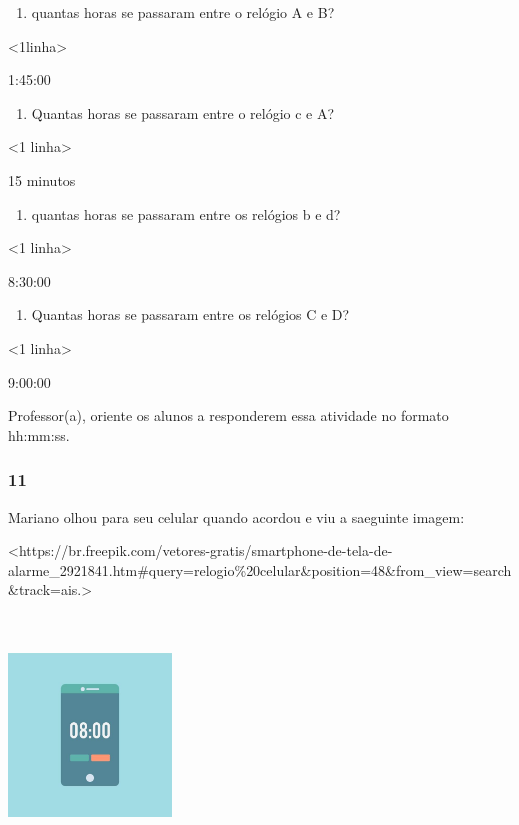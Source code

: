 \begin{enumerate}
\def\labelenumi{\Alph{enumi})}
\item
  quantas horas se passaram entre o relógio A e B?
\end{enumerate}

\textless{}1linha\textgreater{}

1:45:00

\begin{enumerate}
\def\labelenumi{\Alph{enumi})}
\item
  Quantas horas se passaram entre o relógio c e A?
\end{enumerate}

\textless{}1 linha\textgreater{}

15 minutos

\begin{enumerate}
\def\labelenumi{\Alph{enumi})}
\item
  quantas horas se passaram entre os relógios b e d?
\end{enumerate}

\textless{}1 linha\textgreater{}

8:30:00

\begin{enumerate}
\def\labelenumi{\Alph{enumi})}
\item
  Quantas horas se passaram entre os relógios C e D?
\end{enumerate}

\textless{}1 linha\textgreater{}

9:00:00

Professor(a), oriente os alunos a responderem essa atividade no formato
hh:mm:ss.

\subsubsection{11}\label{section-49}

Mariano olhou para seu celular quando acordou e viu a saeguinte imagem:

\textless{}https://br.freepik.com/vetores-gratis/smartphone-de-tela-de-alarme\_2921841.htm\#query=relogio\%20celular\&position=48\&from\_view=search\&track=ais.\textgreater{}

\includegraphics[width=1.70922in,height=2.53170in]{media/image39.jpg}

